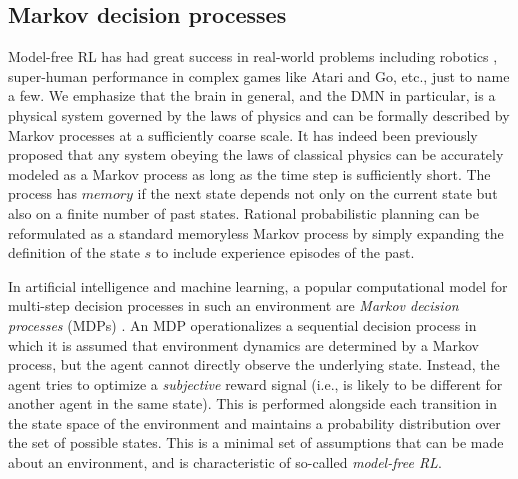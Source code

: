 \documentclass[10pt,letterpaper]{article}
\begin{document}
\subsection{Markov decision processes}
Model-free RL has had great success in real-world problems including robotics
\citep{ng2004,abbeel2004},
super-human performance in complex games like Atari\citep{mnih2015} and Go\citep{silver2016mastering}, etc., just to name a few.
We emphasize that the brain in general, and the DMN in particular,
is a physical system governed by the laws of
physics and can be formally described
by Markov processes at a sufficiently coarse scale.
It has indeed been previously proposed \citep{tegmark2016improved} that
any system obeying the laws of classical physics can be accurately modeled as a Markov process as long as the time
step is sufficiently short.
The process has $memory$ if the next state depends not only on the current state
but also on a finite number of past states.
Rational probabilistic planning can be reformulated
as a standard memoryless Markov process by simply expanding the
definition of the state $s$ to include experience episodes of the past.


In artificial intelligence and machine learning, a popular computational model for
multi-step decision processes in such an environment are
\textit{Markov decision processes} (MDPs) \citep{sutton1998reinforcement}.
An MDP operationalizes a sequential decision process
in which it is assumed that environment dynamics are determined by a Markov process,
but the agent cannot directly observe the underlying state.
Instead, the agent tries to optimize a \textit{subjective} reward
signal (i.e., is likely to be different for another agent in the same state).
This is performed alongside each transition in the state space of the environment
 and maintains a probability distribution over the set of possible
states.
This is a minimal set of assumptions that can be made about an environment,
and is characteristic of so-called \textit{model-free RL}.
\end{document}
